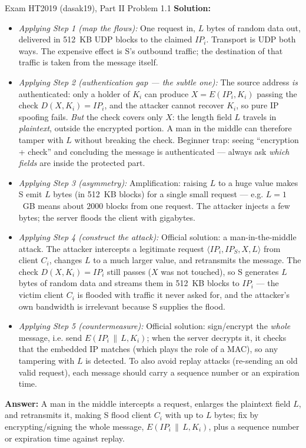 \documentclass[12pt, a4paper]{article}
\begin{document}
\begin{practicebox}{Exam HT2019 (dasak19), Part II Problem 1.1}
\textbf{Solution:}
\begin{itemize}
    \item \textit{Applying Step 1 (map the flows):} One request in, $L$ bytes of random data out, delivered in 512~KB UDP blocks to the claimed $IP_i$. Transport is UDP both ways. The expensive effect is S's outbound traffic; the destination of that traffic is taken from the message itself.
    \item \textit{Applying Step 2 (authentication gap --- the subtle one):} The source address \emph{is} authenticated: only a holder of $K_i$ can produce $X = E(IP_i, K_i)$ passing the check $D(X, K_i) = IP_i$, and the attacker cannot recover $K_i$, so pure IP spoofing fails. \emph{But} the check covers only $X$: the length field $L$ travels in \emph{plaintext}, outside the encrypted portion. A man in the middle can therefore tamper with $L$ without breaking the check. Beginner trap: seeing ``encryption + check'' and concluding the message is authenticated --- always ask \emph{which fields} are inside the protected part.
    \item \textit{Applying Step 3 (asymmetry):} Amplification: raising $L$ to a huge value makes S emit $L$ bytes (in 512~KB blocks) for a single small request --- e.g. $L = 1$~GB means about $2000$ blocks from one request. The attacker injects a few bytes; the server floods the client with gigabytes.
    \item \textit{Applying Step 4 (construct the attack):} Official solution: a man-in-the-middle attack. The attacker intercepts a legitimate request $\langle IP_i, IP_S, X, L \rangle$ from client $C_i$, changes $L$ to a much larger value, and retransmits the message. The check $D(X, K_i) = IP_i$ still passes ($X$ was not touched), so S generates $L$ bytes of random data and streams them in 512~KB blocks to $IP_i$ --- the victim client $C_i$ is flooded with traffic it never asked for, and the attacker's own bandwidth is irrelevant because S supplies the flood.
    \item \textit{Applying Step 5 (countermeasure):} Official solution: sign/encrypt the \emph{whole} message, i.e. send $E(IP_i \,\|\, L, K_i)$; when the server decrypts it, it checks that the embedded IP matches (which plays the role of a MAC), so any tampering with $L$ is detected. To also avoid replay attacks (re-sending an old valid request), each message should carry a sequence number or an expiration time.
\end{itemize}
\textbf{Answer:} A man in the middle intercepts a request, enlarges the plaintext field $L$, and retransmits it, making S flood client $C_i$ with up to $L$ bytes; fix by encrypting/signing the whole message, $E(IP_i \,\|\, L, K_i)$, plus a sequence number or expiration time against replay.
\end{practicebox}
\end{document}

